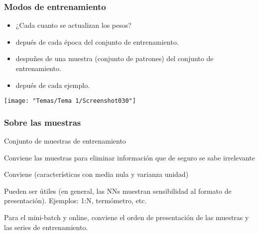 \subsubsection{Modos de entrenamiento}
\begin{itemize}[label=\color{red}\textbullet, leftmargin=*]
	\item \color{lightblue}¿Cada cuanto se actualizan los pesos?
\end{itemize}
\begin{itemize}
	\item {} depués de cada época del conjunto de entrenamiento.
	\item {} despuñes de una muestra (conjunto de patrones) del conjunto de entrenamiento.
	\item {} depués de cada ejemplo.
\end{itemize}
\begin{center}
	\texttt{[image: "Temas/Tema 1/Screenshot030"]}
\end{center}
\subsubsection{Sobre las muestras}
Conjunto de muestras de entrenamiento 

Conviene  las muestras para eliminar información que de seguro se sabe irrelevante

Conviene  (características con media nula y varianza unidad)

Pueden ser útiles  (en general, las NNs muestran sensibilidad al formato de presentación). Ejemplos: 1:N, termómetro, etc.

Para el mini-batch y online, conviene  el orden de presentación de las muestras y  las series de entrenamiento.